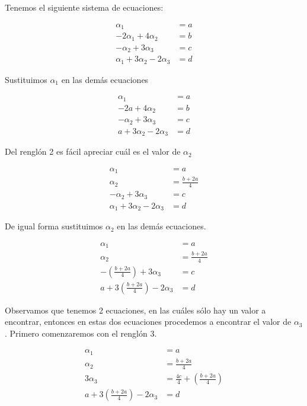 \documentclass[letterpaper]{article}
\renewcommand{\*}{\cdot}
\theoremstyle{definition}
\begin{document}
	Tenemos el siguiente sistema de ecuaciones:
	\begin{center}
		\begin{align*}
		\alpha_{1}&=a\\
		-2\alpha_{1}+4\alpha_{2}&=b\\
		-\alpha_{2}+3\alpha_{3}&=c\\
		\alpha_{1}+3\alpha_{2}-2\alpha_{3}&=d
		\end{align*}
	\end{center}
	Sustituimos $\alpha_{1}$ en las demás ecuaciones
	\begin{center}
		\begin{align*}
		\alpha_{1}&=a\\
		-2a+4\alpha_{2}&=b\\
		-\alpha_{2}+3\alpha_{3}&=c\\
		a+3\alpha_{2}-2\alpha_{3}&=d
		\end{align*}
	\end{center}
	Del renglón 2 es fácil apreciar cuál es el valor de $\alpha_{2}$
	\begin{center}
		\begin{align*}
		\alpha_{1}&=a\\
		\alpha_{2}&=\frac{b+2a}{4}\\
		-\alpha_{2}+3\alpha_{3}&=c\\
		\alpha_{1}+3\alpha_{2}-2\alpha_{3}&=d
		\end{align*}
	\end{center}
	De igual forma sustituimos $\alpha_{2}$ en las demás ecuaciones.
	\begin{center}
		\begin{align*}
		\alpha_{1}&=a\\
		\alpha_{2}&=\frac{b+2a}{4}\\
		-\left( \frac{b+2a}{4} \right)+3\alpha_{3}&=c\\
		a+3\left( \frac{b+2a}{4} \right)-2\alpha_{3}&=d
		\end{align*}
	\end{center}
	Observamos que tenemos 2 ecuaciones, en las cuáles sólo hay un valor a encontrar, entonces en estas dos ecuaciones procedemos a encontrar el valor de $\alpha_{3}$. Primero comenzaremos con el renglón 3.
	\begin{center}
		\begin{align*}
		\alpha_{1}&=a\\
		\alpha_{2}&=\frac{b+2a}{4}\\
		3\alpha_{3}&=\frac{4c}{4}+\left( \frac{b+2a}{4} \right)\\
		a+3\left( \frac{b+2a}{4} \right)-2\alpha_{3}&=d
		\end{align*}
	\end{center}
\end{document}

